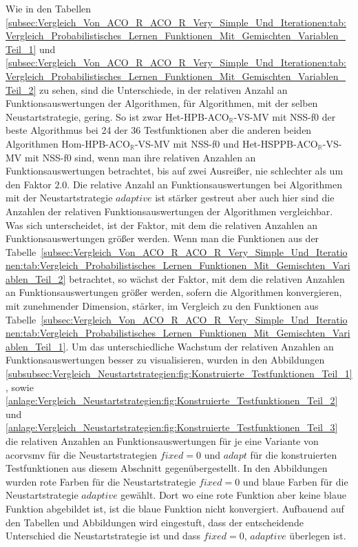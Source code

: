 \documentclass[fontsize=12, a4aper]{scrartcl}
\begin{document}
	Wie in den Tabellen \ref{subsec:Vergleich_Von_ACO_R_ACO_R_Very_Simple_Und_Iterationen:tab:Vergleich_Probabilistisches_Lernen_Funktionen_Mit_Gemischten_Variablen_Teil_1} und \ref{subsec:Vergleich_Von_ACO_R_ACO_R_Very_Simple_Und_Iterationen:tab:Vergleich_Probabilistisches_Lernen_Funktionen_Mit_Gemischten_Variablen_Teil_2} zu sehen, sind die Unterschiede, in der relativen Anzahl an Funktionsauswertungen der Algorithmen, für Algorithmen, mit der selben Neustartstrategie, gering. So ist zwar Het-HPB-ACO\(_\mathbb{R}\)-VS-MV mit NSS-f0 der beste Algorithmus bei 24 der 36 Testfunktionen aber die anderen beiden Algorithmen Hom-HPB-ACO\(_\mathbb{R}\)-VS-MV mit NSS-f0 und Het-HSPPB-ACO\(_\mathbb{R}\)-VS-MV mit NSS-f0 sind, wenn man ihre relativen Anzahlen an Funktionsauswertungen betrachtet, bis auf zwei Ausreißer, nie schlechter als um den Faktor \(2.0\). Die relative Anzahl an Funktionsauswertungen bei Algorithmen mit der Neustartstrategie \(adaptive\) ist stärker gestreut aber auch hier sind die Anzahlen der relativen Funktionsauswertungen der Algorithmen vergleichbar. Was sich unterscheidet, ist der Faktor, mit dem die relativen Anzahlen an Funktionsauswertungen größer werden. Wenn man die Funktionen aus der Tabelle~\ref{subsec:Vergleich_Von_ACO_R_ACO_R_Very_Simple_Und_Iterationen:tab:Vergleich_Probabilistisches_Lernen_Funktionen_Mit_Gemischten_Variablen_Teil_2} betrachtet, so wächst der Faktor, mit dem die relativen Anzahlen an Funktionsauswertungen größer werden, sofern die Algorithmen konvergieren, mit zunehmender Dimension, stärker, im Vergleich zu den Funktionen aus Tabelle~\ref{subsec:Vergleich_Von_ACO_R_ACO_R_Very_Simple_Und_Iterationen:tab:Vergleich_Probabilistisches_Lernen_Funktionen_Mit_Gemischten_Variablen_Teil_1}. Um das unterschiedliche Wachstum der relativen Anzahlen an Funktionsauswertungen besser zu visualisieren, wurden in den Abbildungen \ref{subsubsec:Vergleich_Neustartstrategien:fig:Konstruierte_Testfunktionen_Teil_1}, sowie \ref{anlage:Vergleich_Neustartstrategien:fig:Konstruierte_Testfunktionen_Teil_2} und \ref{anlage:Vergleich_Neustartstrategien:fig:Konstruierte_Testfunktionen_Teil_3} die relativen Anzahlen an Funktionsauswertungen für je eine Variante von \ac{acorvsmv} für die Neustartstrategien \(fixed = 0\) und \(adapt\) für die konstruierten Testfunktionen aus diesem Abschnitt gegenübergestellt. In den Abbildungen wurden rote Farben für die Neustartstrategie \(fixed = 0\) und blaue Farben für die Neustartstrategie \(adaptive\) gewählt. Dort wo eine rote Funktion aber keine blaue Funktion abgebildet ist, ist die blaue Funktion nicht konvergiert. Aufbauend auf den Tabellen und Abbildungen wird eingestuft, dass der entscheidende Unterschied die Neustartstrategie ist und dass \(fixed = 0\), \(adaptive\) überlegen ist.
	
\end{document}
